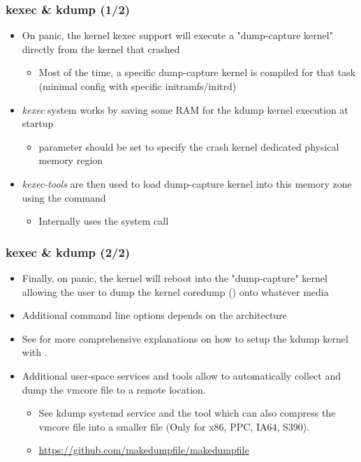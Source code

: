 \begin{frame}[fragile]
  \frametitle{kexec \& kdump (1/2)}
  \begin{itemize}
    \item On panic, the kernel kexec support will execute a "dump-capture
      kernel" directly from the kernel that crashed
    \begin{itemize}
      \item Most of the time, a specific dump-capture kernel is compiled
        for that task (minimal config with specific initramfs/initrd)
    \end{itemize}
    \item {\em kexec} system works by saving some RAM for the kdump kernel
      execution at startup
    \begin{itemize}
      \item {} parameter should be set to specify the crash
            kernel dedicated physical memory region
    \end{itemize}
    \item {\em kexec-tools} are then used to load dump-capture kernel into
      this memory zone using the  command
    \begin{itemize}
      \item Internally uses the  system call
    \end{itemize}
  \end{itemize}
\end{frame}

\begin{frame}
  \frametitle{kexec \& kdump (2/2)}
  \begin{itemize}
    \item Finally, on panic, the kernel will reboot into the "dump-capture"
      kernel allowing the user to dump the kernel coredump ()
      onto whatever media
    \item Additional command line options depends on the architecture
    \item See  for more comprehensive
      explanations on how to setup the kdump kernel with .
    \item Additional user-space services and tools allow to automatically
      collect and dump the vmcore file to a remote location.
    \begin{itemize}
      \item See kdump systemd service and the  tool which
        can also compress the vmcore file into a smaller file (Only for x86,
        PPC, IA64, S390).
      \item \url{https://github.com/makedumpfile/makedumpfile}
    \end{itemize}
  \end{itemize}
\end{frame}

